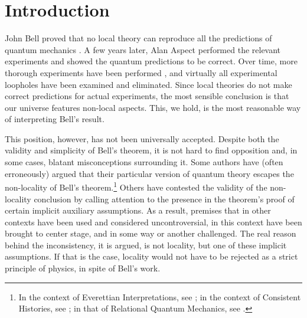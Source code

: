 \documentclass[letterpaper,12pt]{article}
\begin{document}
\section{Introduction}
	
John Bell proved that no local theory can reproduce all the predictions of quantum mechanics \cite{Bell1964,Bell1971,Bell1976,Bell1990}. A few years later, Alan Aspect performed the relevant experiments \cite{Aspect1981,Aspect1982} and showed the quantum predictions to be correct. Over time, more thorough experiments have been performed \cite{weihs1998, Giustina2015, Shalm, Hensen2015}, and virtually all experimental loopholes have been examined and eliminated. Since local theories do not make correct predictions for actual experiments, the most sensible conclusion is that our universe features non-local aspects. This, we hold, is the most reasonable way of interpreting Bell's result.

This position, however, has not been universally accepted. Despite both the validity and simplicity of Bell's theorem, it is not hard to find opposition and, in some cases, blatant misconceptions surrounding it. Some authors have (often erroneously) argued that their particular version of quantum theory escapes the non-locality of Bell's theorem.\footnote{In the context of Everettian Interpretations, see \cite{wallace2012}; in the context of Consistent Histories, see \cite{griffiths2011}; in that of Relational Quantum Mechanics, see \cite{RovelliEPR}.} Others have contested the validity of the non-locality conclusion by calling attention to the presence in the theorem's proof of certain implicit auxiliary assumptions. As a result, premises that in other contexts have been used and considered uncontroversial, in this context have been brought to center stage, and in some way or another challenged. The real reason behind the inconsistency, it is argued, is not locality, but one of these implicit assumptions. If that is the case, locality would not have to be rejected as a strict principle of physics, in spite of Bell's work.
\end{document}
